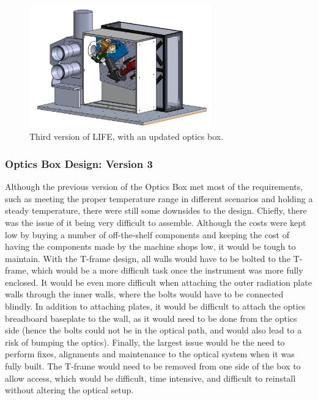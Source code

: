 \begin{figure}
    \centering
    \includegraphics[width=0.7\textwidth]{chap3_images/LIFE_V3_images/LIFE_V3.JPG}
    \caption{Third version of LIFE, with an updated optics box.}
    \label{fig:LIFE_V3}
\end{figure}

\subsubsection{Optics Box Design: Version 3}
Although the previous version of the Optics Box met most of the requirements, such as meeting the proper temperature range in different scenarios and holding a steady temperature, there were still some downsides to the design. Chiefly, there was the issue of it being very difficult to assemble. Although the costs were kept low by buying a number of off-the-shelf components and keeping the cost of having the components made by the machine shops low, it would be tough to maintain. With the T-frame design, all walls would have to be bolted to the T-frame, which would be a more difficult task once the instrument was more fully enclosed. It would be even more difficult when attaching the outer radiation plate walls through the inner walls, where the bolts would have to be connected blindly. In addition to attaching plates, it would be difficult to attach the optics breadboard baseplate to the wall, as it would need to be done from the optics side (hence the bolts could not be in the optical path, and would also lead to a risk of bumping the optics). Finally, the largest issue would be the need to perform fixes, alignments and maintenance to the optical system when it was fully built. The T-frame would need to be removed from one side of the box to allow access, which would be difficult, time intensive, and difficult to reinstall without altering the optical setup.


